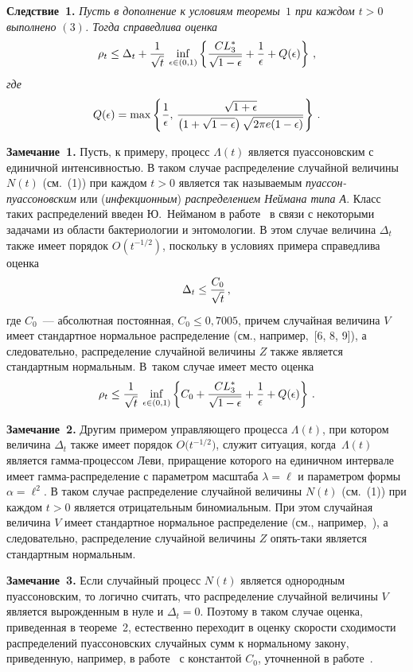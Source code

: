 \begin{multicols}{2}
\smallskip

\noindent
\textbf{Следствие~1.} {\it Пусть в дополнение к условиям тео\-ре\-мы~$1$
при каждом $t>0$ выполнено $(3)$. Тогда справедлива оценка
$$
\rho_t \leq \Delta_t
+\displaystyle\frac{\displaystyle 1\mathstrut}{\displaystyle \sqrt{t}\mathstrut}\,\inf_{\epsilon\in(0,1)}\left \{\displaystyle\frac{\displaystyle CL^*_3\mathstrut}{\displaystyle \sqrt{1-\epsilon}\mathstrut}+
\displaystyle\frac{\displaystyle 1\mathstrut}{\displaystyle \epsilon\mathstrut}+Q(\epsilon)\right \}\,,
$$
где}
$$
Q(\epsilon)=\max\left \{\displaystyle\frac{\displaystyle 1\mathstrut}{\displaystyle \epsilon\mathstrut},\,\displaystyle\frac{\displaystyle \sqrt{1+\epsilon}\mathstrut}{\displaystyle \left (1+\sqrt{1-\epsilon}\right )\sqrt{2\pi
e(1-\epsilon)}\mathstrut}\right \}\,.
$$

\medskip

\noindent
\textbf{Замечание~1.} Пусть, к примеру, процесс $\Lambda(t)$ является
пуассоновским с единичной интенсивностью. В таком случае
распределение случайной величины~$N(t)$ (см.~(1)) при каждом $t>0$
является так называемым {\it пуассон-пуассоновским} или
({\it инфекционным}) {\it распределением Неймана
типа А}. Класс таких распределений введен Ю.~Нейманом в работе~\cite{9a}
в связи с некоторыми задачами из области бактериологии и
энтомологии. В этом случае величина $\Delta_t$ также имеет порядок
$O\!\left(t^{-1/2}\right)$, поскольку в условиях примера справедлива
оценка
$$
\Delta_t\le\displaystyle\frac{\displaystyle C_0\mathstrut}{\displaystyle \sqrt{t}\mathstrut}\,,
$$
где $C_0$~--- абсолютная постоянная, $C_0\le 0{,}7005$, причем
случайная величина $V$ имеет стандартное нормальное распределение
(см., например,~[6, 8, 9]), а следовательно, распределение
случайной величины $Z$ также является стандартным нормальным. 
В~таком случае имеет место оценка
$$
\rho_t \leq \displaystyle\frac{\displaystyle 1\mathstrut}{\displaystyle \sqrt{t}\mathstrut}\,\inf_{\epsilon\in(0,1)}\left\{C_0+
\displaystyle\frac{\displaystyle CL^*_3\mathstrut}{\displaystyle \sqrt{1-\epsilon}\mathstrut}+\displaystyle\frac{\displaystyle 1\mathstrut}{\displaystyle \epsilon\mathstrut}+Q(\epsilon)\right\}\,.
$$

\medskip

\noindent
\textbf{Замечание~2.} Другим примером управляющего процесса
$\Lambda(t)$, при котором величина $\Delta_t$ также имеет порядок
$O\big(t^{-1/2}\big)$, служит ситуация, когда~$\Lambda(t)$
является гамма-процессом Леви, приращение которого на единичном
интервале имеет гам\-ма-рас\-пре\-де\-ле\-ние с параметром масштаба
$\lambda=\ell$ и параметром формы $\alpha=\ell^2$. В таком случае\linebreak
распределение случайной величины $N(t)$ (см.~(1)) при каждом $t>0$
является отрицательным биномиальным. При этом случайная величина
$V$ имеет стандартное нормальное распределение (см., например,~\cite{6a}), 
а следовательно, распределение случайной величины $Z$
опять-таки является стандартным нормальным.

\medskip

\noindent
\textbf{Замечание~3.} Если случайный процесс $N(t)$ является
однородным пуассоновским, то логично считать, что распределение
случайной величины $V$ является вырожденным в нуле и $\Delta_t=0$.
Поэтому в таком случае оценка, приведенная в теореме~2,
естественно переходит в оценку скорости схо\-ди\-мости распределений
пуассоновских случайных сумм к нормальному закону, приведенную,
например, в работе~\cite{7a} с константой $C_0$, уточненной в работе~\cite{8a}.
{

}
\end{multicols}
